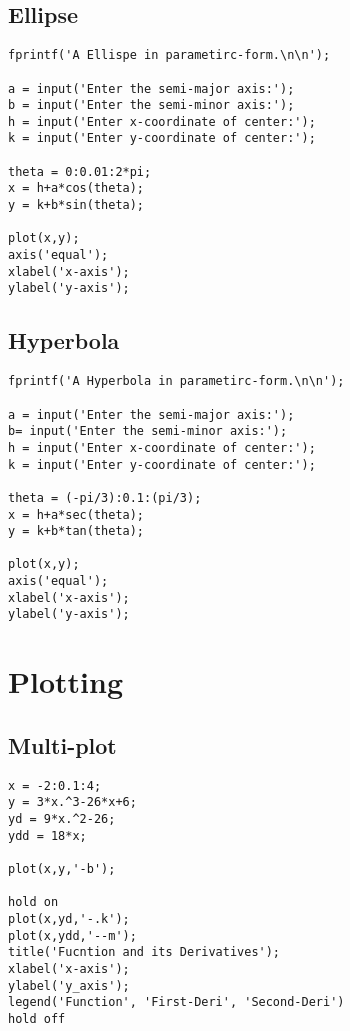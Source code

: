 \subsection{Ellipse}
\begin{verbatim}
fprintf('A Ellispe in parametirc-form.\n\n');

a = input('Enter the semi-major axis:');
b = input('Enter the semi-minor axis:');
h = input('Enter x-coordinate of center:');
k = input('Enter y-coordinate of center:');

theta = 0:0.01:2*pi;
x = h+a*cos(theta);
y = k+b*sin(theta);

plot(x,y);
axis('equal');
xlabel('x-axis');
ylabel('y-axis');
\end{verbatim}

\subsection{Hyperbola}
\begin{verbatim}
fprintf('A Hyperbola in parametirc-form.\n\n');

a = input('Enter the semi-major axis:');
b= input('Enter the semi-minor axis:');
h = input('Enter x-coordinate of center:');
k = input('Enter y-coordinate of center:');

theta = (-pi/3):0.1:(pi/3);
x = h+a*sec(theta);
y = k+b*tan(theta);

plot(x,y);
axis('equal');
xlabel('x-axis');
ylabel('y-axis');
\end{verbatim}



\section{Plotting}

\subsection{Multi-plot}
\begin{verbatim}
x = -2:0.1:4;
y = 3*x.^3-26*x+6;
yd = 9*x.^2-26;
ydd = 18*x;

plot(x,y,'-b');

hold on
plot(x,yd,'-.k');
plot(x,ydd,'--m');
title('Fucntion and its Derivatives');
xlabel('x-axis');
ylabel('y_axis');
legend('Function', 'First-Deri', 'Second-Deri')
hold off
\end{verbatim}


